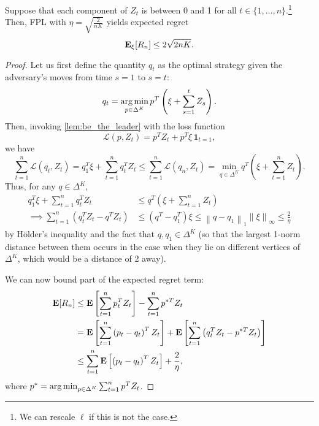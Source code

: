 \begin{theorem} \label{thm:FPL_regret} Suppose that each component of $Z_t$ is between 0 and 1 for all $t \in \{1, \ldots, n\}$.\footnote{We can rescale $\ell$ if this is not the case.} Then, FPL with $\eta = \sqrt{\frac{2}{nK}}$ yields expected regret
\begin{equation}\label{eqn:FPL_regret}
\mathbf{E}_\xi [R_n] \leq 2 \sqrt{2 n K}.
\end{equation}

\begin{proof}
Let us first define the quantity $q_t$ as the optimal strategy given the adversary's moves from time $s=1$ to $s = t$:
\[
q_t = \operatorname*{arg\,min}_{p \in \Delta^K} p^T \left(\xi + \sum_{s = 1}^t Z_s\right).
\]
Then, invoking \autoref{lem:be_the_leader} with the loss function 
\[
\mathcal{L} (p, Z_t) = p^T Z_t + p^T \xi\, \mathbf{1}_{t = 1},
\]
we have
\[
\sum_{t=1}^n \mathcal{L}(q_t, Z_t) = q_1^T \xi + \sum_{t=1}^n q_t^T Z_t \leq \sum_{t=1}^n \mathcal{L}(q_n, Z_t) = \min_{q \in \Delta^K} q^T \left(\xi + \sum_{t=1}^n Z_t\right).
\]
Thus, for any $q \in \Delta^K$, 
\begin{align*}
q_1^T \xi + \sum_{t=1}^n q_t^T Z_t &\leq q^T \left(\xi + \sum_{t=1}^n Z_t\right) \\
\implies \sum_{t=1}^n\left(q_t^T Z_t - q^T Z_t\right) &\leq \left(q^T - q_1^T\right) \xi \leq \left\|q - q_1\right\|_1 \left\|\xi\right\|_{\infty} \leq \frac{2}{\eta}
\end{align*}
by H\"older's inequality and the fact that $q, q_1 \in \Delta^K$ (so that the largest 1-norm distance between them occurs in the case when they lie on different vertices of $\Delta^K$, which would be a distance of 2 away).

We can now bound part of the expected regret term:
\begin{align}
\mathbf{E} [R_n] &\leq \mathbf{E}\left[ \sum_{t=1}^n p_t^T Z_t\right] - \sum_{t=1}^n p^{*T}Z_t \nonumber\\
&= \mathbf{E} \left[\sum_{t=1}^n \left(p_t - q_t\right)^T Z_t\right] + \mathbf{E}\left[\sum_{t=1}^n \left(q_t^T Z_t - p^{*T} Z_t \right) \right]\nonumber \\
&\leq \sum_{t=1}^n \mathbf{E}\left[\left(p_t - q_t \right)^T Z_t \right] + \frac{2}{\eta},\label{eqn:e_regret_half}
\end{align}
where $p^* = \operatorname*{arg\,min}_{p \in \Delta^K} \sum_{t=1}^n p^T Z_t$.


\end{proof}
\end{theorem}
